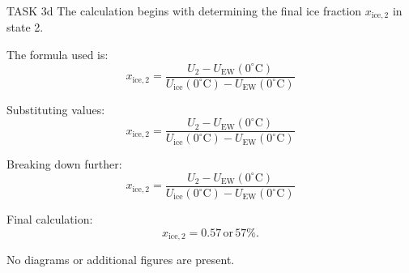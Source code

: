 TASK 3d  
The calculation begins with determining the final ice fraction \( x_{\text{ice},2} \) in state 2.  

The formula used is:  
\[
x_{\text{ice},2} = \frac{U_2 - U_{\text{EW}}(0^\circ\text{C})}{U_{\text{ice}}(0^\circ\text{C}) - U_{\text{EW}}(0^\circ\text{C})}
\]

Substituting values:  
\[
x_{\text{ice},2} = \frac{U_2 - U_{\text{EW}}(0^\circ\text{C})}{U_{\text{ice}}(0^\circ\text{C}) - U_{\text{EW}}(0^\circ\text{C})}
\]

Breaking down further:  
\[
x_{\text{ice},2} = \frac{U_2 - U_{\text{EW}}(0^\circ\text{C})}{U_{\text{ice}}(0^\circ\text{C}) - U_{\text{EW}}(0^\circ\text{C})}
\]

Final calculation:  
\[
x_{\text{ice},2} = 0.57 \, \text{or} \, 57\%.
\]  

No diagrams or additional figures are present.